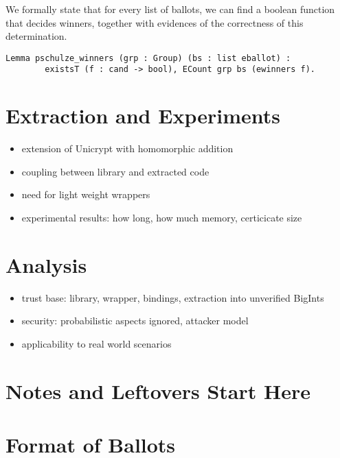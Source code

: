 \documentclass{llncs}
\begin{document}
We formally state that for every list of ballots, we can find a boolean function 
that decides winners, together with evidences of the correctness of this determination.
\begin{verbatim}
Lemma pschulze_winners (grp : Group) (bs : list eballot) :
        existsT (f : cand -> bool), ECount grp bs (ewinners f).
\end{verbatim}




\section{Extraction and Experiments}
\begin{itemize}
  \item extension of Unicrypt with homomorphic addition
  \item coupling between library and extracted code
  \item need for light weight wrappers
  \item experimental results: how long, how much memory, certicicate
  size
\end{itemize}

\section{Analysis}
\begin{itemize}
  \item trust base: library, wrapper, bindings, extraction into
  unverified BigInts
  \item security: probabilistic aspects ignored, attacker model
  \item applicability to real world scenarios
\end{itemize}




\appendix
\section*{Notes and Leftovers Start Here}



\section{Format of Ballots}
\end{document}
